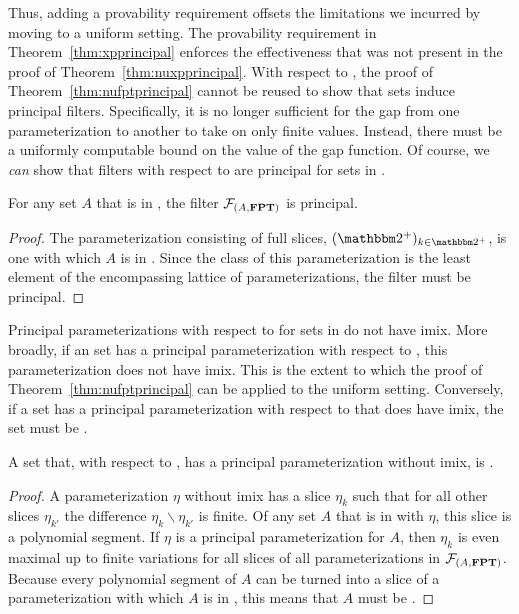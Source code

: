 Thus, adding a provability requirement offsets the limitations we incurred by moving to a uniform setting.
The provability requirement in Theorem~\ref{thm:xpprincipal} enforces the effectiveness that was not present in the proof of Theorem~\ref{thm:nuxpprincipal}.
With respect to , the proof of Theorem~\ref{thm:nufptprincipal} cannot be reused to show that  sets induce principal filters.
Specifically, it is no longer sufficient for the gap from one parameterization to another to take on only finite values.
Instead, there must be a uniformly computable bound on the value of the gap function.
Of course, we \emph{can} show that filters with respect to  are principal for sets in .
\begin{theorem}
\label{thm:fptprincipal}
  For any set $A$ that is in , the filter $\mathcal{F}_{(A, \textnormal{\textbf{FPT}})}$ is principal.
\end{theorem}
\begin{proof}
  The parameterization consisting of full slices, $(\binary^+)_{k \in \binary^+}$, is one with which $A$ is in .
  Since the class of this parameterization is the least element of the encompassing lattice of parameterizations, the filter must be principal.
\end{proof}

Principal parameterizations with respect to  for sets in  do not have imix.
More broadly, if an  set has a principal parameterization with respect to , this parameterization does not have imix.
This is the extent to which the proof of Theorem~\ref{thm:nufptprincipal} can be applied to the uniform setting.
Conversely, if a set has a principal parameterization with respect to  that does have imix, the set must be .
\begin{lemma}
\label{lem:fptimix}
  A set that, with respect to , has a principal parameterization without imix, is .
\end{lemma}
\begin{proof}
  A parameterization $\eta$ without imix has a slice $\eta_k$ such that for all other slices $\eta_{k'}$ the difference $\eta_k \backslash \eta_{k'}$ is finite.
  Of any set $A$ that is in  with $\eta$, this slice is a polynomial segment.
  If $\eta$ is a principal parameterization for $A$, then $\eta_k$ is even maximal up to finite variations for all slices of all parameterizations in $\mathcal{F}_{(A, \textnormal{\textbf{FPT}})}$.
  Because every polynomial segment of $A$ can be turned into a slice of a parameterization with which $A$ is in , this means that $A$ must be .
\end{proof}

